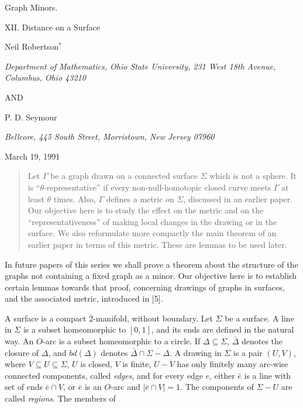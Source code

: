 {\centering
{\Large Graph Minors.\par}
{\large XII. Distance on a Surface\par}\medskip

Neil Robertson$^*$\par
\textit{Department of Mathematics, Ohio State University, 231 West 18th Avenue, Columbus, Ohio 43210}\par
AND\par
P. D. Seymour\par
\textit{Bellcore, 445 South Street, Morristown, New Jersey 07960}\par
March 19, 1991\par
}
\begin{quote}
Let $\Gamma$ be a graph drawn on a connected surface $\Sigma$ which is not a sphere. It is ``$\theta$-representative'' if every non-null-homotopic closed curve meets $\Gamma$ at least $\theta$ times. Also, $\Gamma$ defines a metric on $\Sigma$, discussed in an earlier paper. Our objective here is to study the effect on the metric and on the ``representativeness'' of making local changes in the drawing or in the surface. We also reformulate more compactly the main theorem of an earlier paper in terms of this metric. These are lemmas to be used later.
\end{quote}


In future papers of this series we shall prove a theorem about the structure of the graphs not containing a fixed graph as a minor. Our objective here is to establish certain lemmas towards that proof, concerning drawings of graphs in surfaces, and the associated metric, introduced in [5].

A surface is a compact 2-manifold, without boundary. Let $\Sigma$ be a surface. A line in $\Sigma$ is a subset homeomorphic to $[0, 1]$, and its ends are defined in the natural way. An $O$-arc is a subset homeomorphic to a circle. If $\Delta \subseteq \Sigma$, $\bar{\Delta}$ denotes the closure of $\Delta$, and $bd(\Delta)$ denotes $\bar{\Delta} \cap \overline{\Sigma - \Delta}$. A drawing in $\Sigma$ is a pair $(U, V)$, where $V \subseteq U \subseteq \Sigma$, $U$ is closed, $V$ is finite, $U - V$ has only finitely many arc-wise connected components, called \textit{edges}, and for every edge $e$, either $\bar{e}$ is a line with set of ends $\bar{e} \cap V$, or $\bar{e}$ is an $O$-arc and $|\bar{e} \cap V| = 1$. The components of $\Sigma - U$ are called \textit{regions}. The members of%
